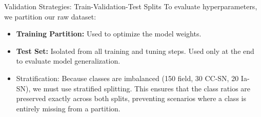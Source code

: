 \documentclass[9pt]{beamer}
\begin{document}
\begin{frame}{Validation Strategies: Train-Validation-Test Splits}
  To evaluate hyperparameters, we partition our raw dataset:
  \begin{center}
  \end{center}
  \begin{itemize}
    \item \textbf{Training Partition:} Used to optimize the model weights.
    \item \textbf{Test Set:} Isolated from all training and tuning steps. Used only at the end to evaluate model generalization.
    \item \alert{Stratification:} Because classes are imbalanced (150 field, 30 CC-SN, 20 Ia-SN), we must use stratified splitting. This ensures that the class ratios are preserved exactly across both splits, preventing scenarios where a class is entirely missing from a partition.
  \end{itemize}
\end{frame}
\end{document}
